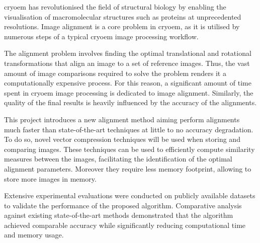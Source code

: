 \documentclass[../main.tex]{subfiles}
\begin{document}
\gls{cryoem} has revolutionised the field of structural biology by enabling the visualisation of macromolecular structures such as proteins at unprecedented resolutions. Image alignment is a core problem in \gls{cryoem}, as it is utilised by numerous steps of a typical \gls{cryoem} image processing workflow. 

The alignment problem involves finding the optimal translational and rotational transformations that align an image to a set of reference images. Thus, the vast amount of image comparisons required to solve the problem renders it a computationally expensive process. For this reason, a significant amount of time spent in \gls{cryoem} image processing is dedicated to image alignment. Similarly, the quality of the final results is heavily influenced by the accuracy of the alignments.

This project introduces a new alignment method aiming perform alignments much faster than state-of-the-art techniques at little to no accuracy degradation. To do so, novel vector compression techniques will be used when storing and comparing images. These techniques can be used to efficiently compute similarity measures between the images, facilitating the identification of the optimal alignment parameters. Moreover they require less memory footprint, allowing to store more images in memory.

Extensive experimental evaluations were conducted on publicly available datasets to validate the performance of the proposed algorithm. Comparative analysis against existing state-of-the-art methods demonstrated that the algorithm achieved comparable accuracy while significantly reducing computational time and memory usage.
\end{document}
